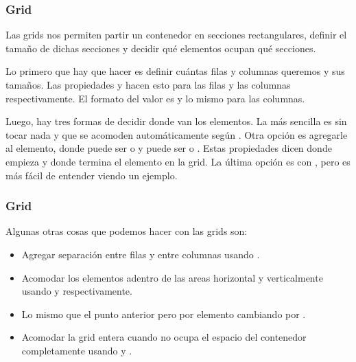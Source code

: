 \begin{frame}
\frametitle{Grid}

    Las grids nos permiten partir un contenedor en secciones rectangulares, definir 
    el tamaño de dichas secciones y decidir qué elementos ocupan qué secciones.

    Lo primero que hay que hacer es definir cuántas filas y columnas queremos y sus 
    tamaños. Las propiedades  y  
    hacen esto para las filas y las columnas respectivamente. El formato del valor es 
     y lo mismo para las 
    columnas.

    Luego, hay tres formas de decidir donde van los elementos. La más sencilla es 
    sin tocar nada y que se acomoden automáticamente según .
    Otra opción es agregarle  al elemento, donde  puede ser 
     o  y  puede ser  
    o . Estas propiedades dicen donde empieza y donde termina el elemento en la 
    grid. La última opción es con , pero es más fácil 
    de entender viendo un ejemplo.

\end{frame}

\begin{frame}
    \frametitle{Grid}

    Algunas otras cosas que podemos hacer con las grids son:

    \begin{itemize}
        \item Agregar separación entre filas y entre columnas usando .
        \item Acomodar los elementos adentro de las areas horizontal y verticalmente 
              usando  y  respectivamente.
        \item Lo mismo que el punto anterior pero por elemento cambiando  
              por .
        \item Acomodar la grid entera cuando no ocupa el espacio del contenedor completamente
              usando  y .
    \end{itemize}

\end{frame}

